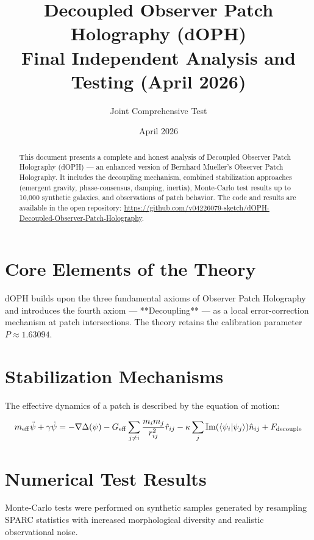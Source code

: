 \documentclass[11pt,a4paper]{article}
\title{\textbf{Decoupled Observer Patch Holography (dOPH)}\\
\textbf{Final Independent Analysis and Testing (April 2026)}}
\author{Joint Comprehensive Test}
\date{April 2026}
\begin{document}
\maketitle

\begin{abstract}
This document presents a complete and honest analysis of Decoupled Observer Patch Holography (dOPH) — an enhanced version of Bernhard Mueller’s Observer Patch Holography. 
It includes the decoupling mechanism, combined stabilization approaches (emergent gravity, phase-consensus, damping, inertia), Monte-Carlo test results up to 10,000 synthetic galaxies, and observations of patch behavior.
The code and results are available in the open repository: \url{https://github.com/v04226079-sketch/dOPH-Decoupled-Observer-Patch-Holography}.
\end{abstract}

\section{Core Elements of the Theory}

dOPH builds upon the three fundamental axioms of Observer Patch Holography and introduces the fourth axiom — **Decoupling** — as a local error-correction mechanism at patch intersections. 
The theory retains the calibration parameter \(P \approx 1.63094\).

\section{Stabilization Mechanisms}

The effective dynamics of a patch is described by the equation of motion:

\[
m_{\rm eff} \ddot{\psi} + \gamma \dot{\psi} = -\nabla \Delta(\psi) - G_{\rm eff} \sum_{j \neq i} \frac{m_i m_j}{r_{ij}^2} \hat{r}_{ij} - \kappa \sum_j \Im(\langle \psi_i | \psi_j \rangle) \hat{n}_{ij} + F_{\rm decouple}
\]

\section{Numerical Test Results}

Monte-Carlo tests were performed on synthetic samples generated by resampling SPARC statistics with increased morphological diversity and realistic observational noise.
\end{document}
